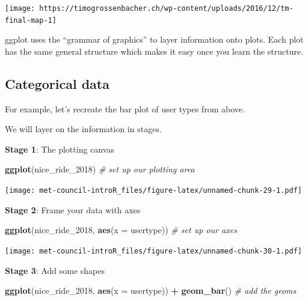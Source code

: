 \documentclass[]{book}
\newenvironment{Shaded}{\begin{snugshade}}{\end{snugshade}}
\newcommand{\KeywordTok}[1]{\textcolor[rgb]{0.13,0.29,0.53}{\textbf{#1}}}
\newcommand{\DataTypeTok}[1]{\textcolor[rgb]{0.13,0.29,0.53}{#1}}
\newcommand{\DecValTok}[1]{\textcolor[rgb]{0.00,0.00,0.81}{#1}}
\newcommand{\StringTok}[1]{\textcolor[rgb]{0.31,0.60,0.02}{#1}}
\newcommand{\CommentTok}[1]{\textcolor[rgb]{0.56,0.35,0.01}{\textit{#1}}}
\newcommand{\OperatorTok}[1]{\textcolor[rgb]{0.81,0.36,0.00}{\textbf{#1}}}
\newcommand{\NormalTok}[1]{#1}
\begin{document}
\texttt{[image: https://timogrossenbacher.ch/wp-content/uploads/2016/12/tm-final-map-1]}

ggplot uses the ``grammar of graphics'' to layer information onto plots.
Each plot has the same general structure which makes it easy once you
learn the structure.

\subsection{Categorical data}\label{categorical-data}

For example, let's recreate the bar plot of user types from above.

We will layer on the information in stages.

\textbf{Stage 1}: The plotting canvas

\begin{Shaded}
\begin{Highlighting}[]
\KeywordTok{ggplot}\NormalTok{(nice_ride_}\DecValTok{2018}\NormalTok{) }\CommentTok{# set up our plotting area }
\end{Highlighting}
\end{Shaded}

\texttt{[image: met-council-introR\_files/figure-latex/unnamed-chunk-29-1.pdf]}

\textbf{Stage 2}: Frame your data with axes

\begin{Shaded}
\begin{Highlighting}[]
\KeywordTok{ggplot}\NormalTok{(nice_ride_}\DecValTok{2018}\NormalTok{, }\KeywordTok{aes}\NormalTok{(}\DataTypeTok{x =}\NormalTok{ usertype)) }\CommentTok{# set up our axes}
\end{Highlighting}
\end{Shaded}

\texttt{[image: met-council-introR\_files/figure-latex/unnamed-chunk-30-1.pdf]}

\textbf{Stage 3}: Add some shapes

\begin{Shaded}
\begin{Highlighting}[]
\KeywordTok{ggplot}\NormalTok{(nice_ride_}\DecValTok{2018}\NormalTok{, }\KeywordTok{aes}\NormalTok{(}\DataTypeTok{x =}\NormalTok{ usertype)) }\OperatorTok{+}\StringTok{ }
\StringTok{  }\KeywordTok{geom_bar}\NormalTok{() }\CommentTok{# add the geoms}
\end{Highlighting}
\end{Shaded}
\end{document}
